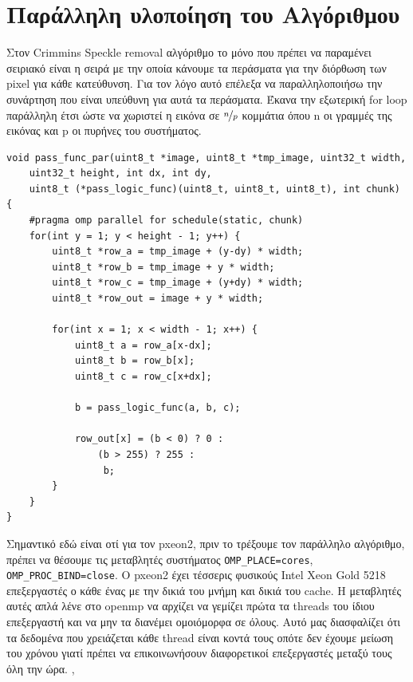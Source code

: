 \documentclass[12pt]{article}
\begin{document}
\newpage

\section{Παράλληλη υλοποίηση του Αλγόριθμου}

Στον Crimmins Speckle removal αλγόριθμο το μόνο που πρέπει να παραμένει σειριακό είναι η σειρά με την οποία κάνουμε τα περάσματα για την διόρθωση των pixel για κάθε κατεύθυνση. Για τον λόγο αυτό επέλεξα να παραλληλοποιήσω την συνάρτηση που είναι υπεύθυνη για αυτά τα περάσματα. Έκανα την εξωτερική for loop παράλληλη έτσι ώστε να χωριστεί η εικόνα σε $\nicefrac{\Large n}{\Large p}$ κομμάτια όπου n οι γραμμές της εικόνας και p οι πυρήνες του συστήματος.

\begin{verbatim}
void pass_func_par(uint8_t *image, uint8_t *tmp_image, uint32_t width,
    uint32_t height, int dx, int dy,
    uint8_t (*pass_logic_func)(uint8_t, uint8_t, uint8_t), int chunk)
{
    #pragma omp parallel for schedule(static, chunk)
    for(int y = 1; y < height - 1; y++) {
        uint8_t *row_a = tmp_image + (y-dy) * width;
        uint8_t *row_b = tmp_image + y * width;
        uint8_t *row_c = tmp_image + (y+dy) * width;
        uint8_t *row_out = image + y * width;

        for(int x = 1; x < width - 1; x++) {
            uint8_t a = row_a[x-dx];
            uint8_t b = row_b[x];
            uint8_t c = row_c[x+dx];

            b = pass_logic_func(a, b, c);

            row_out[x] = (b < 0) ? 0 :
                (b > 255) ? 255 :
                 b;
        }
    }
}
\end{verbatim}

Σημαντικό εδώ είναι οτί για τον pxeon2, πριν το τρέξουμε τον παράλληλο αλγόριθμο, πρέπει να θέσουμε τις μεταβλητές συστήματος \verb|OMP_PLACE=cores|, \verb|OMP_PROC_BIND=close|. Ο pxeon2 έχει τέσσερις φυσικούς Intel Xeon Gold 5218 επεξεργαστές ο κάθε ένας με την δικιά του μνήμη και δικιά του cache. Η μεταβλητές αυτές απλά λένε στο openmp να αρχίζει να γεμίζει πρώτα τα threads του ίδιου επεξεργαστή και να μην τα διανέμει ομοιόμορφα σε όλους. Αυτό μας διασφαλίζει ότι τα δεδομένα που χρειάζεται κάθε thread είναι κοντά τους οπότε δεν έχουμε μείωση του χρόνου γιατί πρέπει να επικοινωνήσουν διαφορετικοί επεξεργαστές μεταξύ τους όλη την ώρα. \cite{klemm2023advanced}, \cite{vanderpas2021numa}\\
\end{document}
